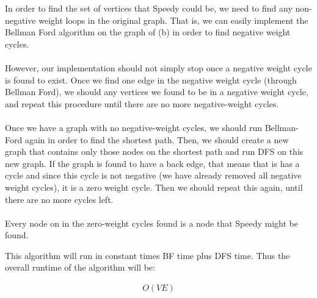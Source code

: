 \documentclass[12pt,twoside]{article}
\begin{document}
\begin{problems}
\begin{problemparts}
\problempart In order to find the set of vertices that Speedy could be, we need to find any non-negative weight loops in the original graph. That is, we can easily implement the Bellman Ford algorithm on the graph of (b) in order to find negative weight cycles. 
\\\\
However, our implementation should not simply stop once a negative weight cycle is found to exist. Once we find one edge in the negative weight cycle (through Bellman Ford), we should any vertices we found to be in a negative weight cycle, and repeat this procedure until there are no more negative-weight cycles. 
\\\\
Once we have a graph with no negative-weight cycles, we should run Bellman-Ford again in order to find the shortest path. Then, we should create a new graph that contains only those nodes on the shortest path and run DFS on this new graph. If the graph is found to have a back edge, that means that is has a cycle and since this cycle is not negative (we have already removed all negative weight cycles), it is a zero weight cycle. Then we should repeat this again, until there are no more cycles left. 
\\\\
Every node on in the zero-weight cycles found is a node that Speedy might be found. 

This algorithm will run in constant times BF time plus DFS time. Thus the overall runtime of the algorithm will be:

\begin{align*}
O(VE)
\end{align*}

\end{problemparts}

\problem  %




\end{problems}
\end{document}
